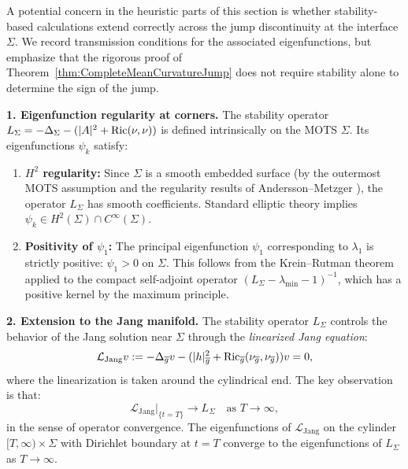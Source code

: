 \begin{remark}\label{rem:TransmissionStability}
A potential concern in the heuristic parts of this section is whether stability-based calculations extend correctly across the jump discontinuity at the interface $\Sigma$. We record transmission conditions for the associated eigenfunctions, but emphasize that the rigorous proof of Theorem~\ref{thm:CompleteMeanCurvatureJump} does not require stability alone to determine the sign of the jump.

\textbf{1. Eigenfunction regularity at corners.} The stability operator $L_\Sigma = -\Delta_\Sigma - (|A|^2 + \mathrm{Ric}(\nu,\nu))$ is defined intrinsically on the MOTS $\Sigma$. Its eigenfunctions $\psi_k$ satisfy:
\begin{enumerate}
    \item[(a)] \textbf{$H^2$ regularity:} Since $\Sigma$ is a smooth embedded surface (by the outermost MOTS assumption and the regularity results of Andersson--Metzger \cite{anderssonmetzger2009}), the operator $L_\Sigma$ has smooth coefficients. Standard elliptic theory implies $\psi_k \in H^2(\Sigma) \cap C^\infty(\Sigma)$.
    
    \item[(b)] \textbf{Positivity of $\psi_1$:} The principal eigenfunction $\psi_1$ corresponding to $\lambda_1$ is strictly positive: $\psi_1 > 0$ on $\Sigma$. This follows from the Krein--Rutman theorem applied to the compact self-adjoint operator $(L_\Sigma - \lambda_{\min} - 1)^{-1}$, which has a positive kernel by the maximum principle.
\end{enumerate}

\textbf{2. Extension to the Jang manifold.} The stability operator $L_\Sigma$ controls the behavior of the Jang solution near $\Sigma$ through the \emph{linearized Jang equation}:
\begin{equation}
    \mathcal{L}_{\text{Jang}} v := -\Delta_{\overline{g}} v - (|h|^2_{\overline{g}} + \mathrm{Ric}_{\overline{g}}(\nu_{\overline{g}}, \nu_{\overline{g}})) v = 0,
\end{equation}
where the linearization is taken around the cylindrical end. The key observation is that:
\begin{equation}
    \mathcal{L}_{\text{Jang}}|_{\{t = T\}} \to L_\Sigma \quad \text{as } T \to \infty,
\end{equation}
in the sense of operator convergence. The eigenfunctions of $\mathcal{L}_{\text{Jang}}$ on the cylinder $[T, \infty) \times \Sigma$ with Dirichlet boundary at $t = T$ converge to the eigenfunctions of $L_\Sigma$ as $T \to \infty$.


\end{remark}
